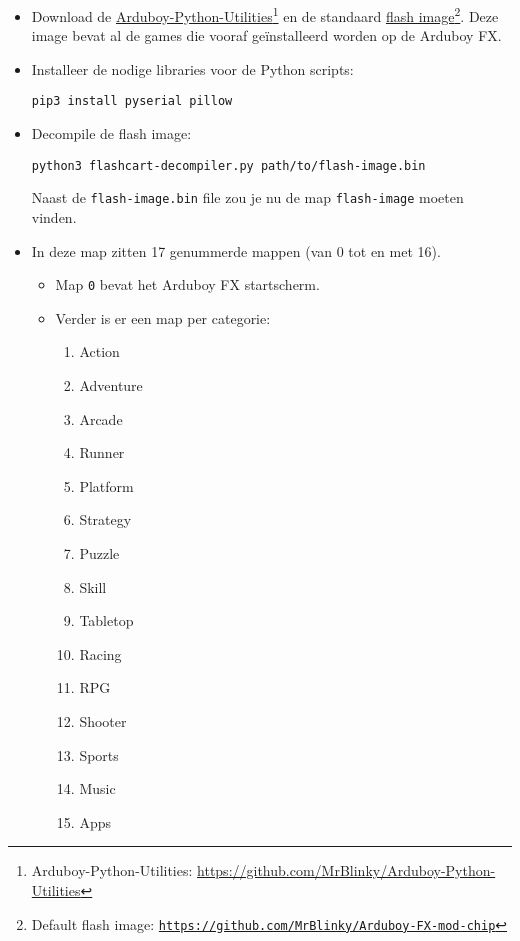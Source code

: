 \documentclass[11pt,fleqn]{book} %
\begin{document}
\begin{itemize}
	\item Download de \href{https://github.com/MrBlinky/Arduboy-Python-Utilities}{Arduboy-Python-Utilities}\footnote{Arduboy-Python-Utilities: \url{https://github.com/MrBlinky/Arduboy-Python-Utilities}} en de standaard \href{https://github.com/MrBlinky/Arduboy-FX-mod-chip/blob/master/portable-activator/flash-image.bin}{flash image}\footnote{Default flash image:  \href{https://github.com/MrBlinky/Arduboy-FX-mod-chip/blob/master/portable-activator/flash-image.bin}{\texttt{https://github.com/MrBlinky/Arduboy-FX-mod-chip}}}. Deze image bevat al de games die vooraf geïnstalleerd worden op de Arduboy FX.
	\item Installeer de nodige libraries voor de Python scripts:
	\begin{verbatim}
pip3 install pyserial pillow
	\end{verbatim}
	\item Decompile de flash image:
	\begin{verbatim}
python3 flashcart-decompiler.py path/to/flash-image.bin
	\end{verbatim}
	Naast de \texttt{flash-image.bin} file zou je nu de map \texttt{flash-image} moeten vinden.
	\newpage
	\item In deze map zitten 17 genummerde mappen (van 0 tot en met 16).
	\begin{itemize}
		\item Map \texttt{0} bevat het Arduboy FX startscherm.
		\item Verder is er een map per categorie:
		\begin{multicols}{4}
			\begin{enumerate}
				\item Action
				\item Adventure
				\item Arcade
				\item Runner
				\item Platform
				\item Strategy
				\item Puzzle
				\item Skill
				\item Tabletop
				\item Racing
				\item RPG
				\item Shooter
				\item Sports
				\item Music
				\item Apps

\end{enumerate}
\end{multicols}
\end{itemize}
\end{itemize}
\end{document}
